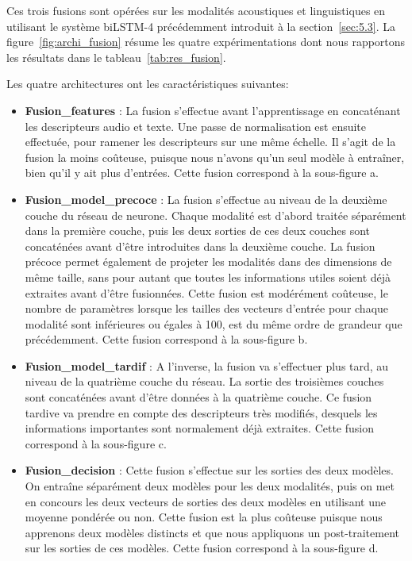 Ces trois fusions sont opérées sur les modalités acoustiques et linguistiques en utilisant le système biLSTM-4 précédemment introduit à la section~\ref{sec:5.3}. La figure~\ref{fig:archi_fusion} résume les quatre expérimentations dont nous rapportons les résultats dans le tableau~\ref{tab:res_fusion}.



Les quatre architectures ont les caractéristiques suivantes:
\begin{itemize}
  \item \textbf{Fusion\_features} : La fusion s'effectue avant l'apprentissage en concaténant les descripteurs audio et texte. Une passe de normalisation est ensuite effectuée, pour ramener les descripteurs sur une même échelle. Il s'agit de la fusion la moins coûteuse, puisque nous n'avons qu'un seul modèle à entraîner, bien qu'il y ait plus d'entrées. Cette fusion correspond à la sous-figure a.
  \item \textbf{Fusion\_model\_precoce} : La fusion s'effectue  au niveau de la deuxième couche du réseau de neurone. Chaque modalité est d'abord traitée séparément dans la première couche, puis les deux sorties de ces deux couches sont concaténées avant d'être introduites dans la deuxième couche. La fusion précoce permet également de projeter les modalités dans des dimensions de même taille, sans pour autant que toutes les informations utiles soient déjà extraites avant d'être fusionnées. Cette fusion est modérément coûteuse, le nombre de paramètres lorsque les tailles des vecteurs d'entrée pour chaque modalité sont inférieures ou égales à 100, est du même ordre de grandeur que précédemment. Cette fusion correspond à la sous-figure b.
  \item \textbf{Fusion\_model\_tardif} : A l'inverse, la fusion va s'effectuer plus tard, au niveau de la quatrième couche du réseau. La sortie des troisièmes couches sont concaténées avant d'être données à la quatrième couche. Ce fusion tardive va prendre en compte des descripteurs très modifiés, desquels les informations importantes sont normalement déjà extraites. Cette fusion correspond à la sous-figure c.
  \item \textbf{Fusion\_decision} : Cette fusion s'effectue sur les sorties des deux modèles. On entraîne séparément deux modèles pour les deux modalités, puis on met en concours les deux vecteurs de sorties des deux modèles en utilisant une moyenne pondérée ou non. Cette fusion est la plus coûteuse puisque nous apprenons deux modèles distincts et que nous appliquons un post-traitement sur les sorties de ces modèles. Cette fusion correspond à la sous-figure d.
\end{itemize}

